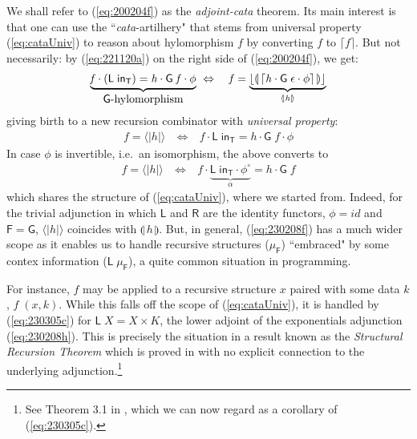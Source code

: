 \documentclass{elsarticle}
\newcommand{\Conid}[1]{\mathit{#1}}
\newcommand{\Varid}[1]{\mathit{#1}}
\def\comp{ \mathbin{\cdot} }
\def\conv#1{#1^\circ}
\def\fun#1{\mathsf{#1}}
\def\wider#1{~ #1 ~}
\def\muF{\mu_{\fun F}}
\def\muF{\mu_{\fun F}}
\def\equiv{\Leftrightarrow}
\def\quanta#1{\mathopen{\langle\!|}#1\mathclose{|\!\rangle}}
\begin{document}
We shall refer to (\ref{eq:200204f}) as the \emph{adjoint-cata} theorem.
Its main interest is that one can use the ``\emph{cata}-artilhery" that stems
from universal property (\ref{eq:cataUniv}) to reason about hylomorphism \ensuremath{\Varid{f}}
by converting \ensuremath{\Varid{f}} to \ensuremath{\lceil \Varid{f}\rceil}. But not necessarily: by (\ref{eq:221120a})
on the right side of (\ref{eq:200204f}), we get:
\begin{eqnarray}
	\underbrace{\ensuremath{\Varid{f} \comp (\fun L \;\mathsf{in}_{\fun T})\mathrel{=}\Varid{h} \comp \fun G \;\Varid{f} \comp \phi }}_{\mbox{\ensuremath{\fun G }-hylomorphism}}
&
	\wider\equiv
&
	\ensuremath{\Varid{f}\mathrel{=}\underbrace{\lfloor \llparenthesis\,\lceil \Varid{h} \comp \fun G \;\epsilon  \comp \phi \rceil\,\rrparenthesis\rfloor}_{\quanta{\Varid{h}}}}
	\label{eq:230305c}
\end{eqnarray}
giving birth to a new recursion combinator with \emph{universal property}:
\begin{eqnarray*}
	\ensuremath{\Varid{f}\mathrel{=}\quanta{\Varid{h}}}
&
	\wider\equiv
&
	\ensuremath{\Varid{f} \comp \fun L \;\mathsf{in}_{\fun T}\mathrel{=}\Varid{h} \comp \fun G \;\Varid{f} \comp \phi }
\end{eqnarray*}
In case \ensuremath{\phi } is invertible, i.e.\ an isomorphism, the above converts to
\begin{eqnarray}
	\ensuremath{\Varid{f}\mathrel{=}\quanta{\Varid{h}}}
&
	\wider\equiv
&
	\ensuremath{\Varid{f} \comp \underbrace{\fun L \;\mathsf{in}_{\fun T} \comp \conv{\phi }}_{\alpha }\mathrel{=}\Varid{h} \comp \fun G \;\Varid{f}}
	\label{eq:230208f} 
\end{eqnarray}
which shares the structure of (\ref{eq:cataUniv}), where we started from.
Indeed, for the trivial adjunction in which \ensuremath{\fun L } and \ensuremath{\fun R } are the identity
functors, \ensuremath{\phi \mathrel{=}{id}} and \ensuremath{\fun F \mathrel{=}\fun G }, \ensuremath{\quanta{\Varid{h}}} coincides with \ensuremath{\llparenthesis\,\Varid{h}\,\rrparenthesis}.
But, in general, (\ref{eq:230208f}) has a much wider scope as it enables us
to handle recursive structures (\ensuremath{\muF }) ``embraced" by some contex information
(\ensuremath{\fun L \;\muF }), a quite common situation in programming. 

For instance, \ensuremath{\Varid{f}} may be applied to a recursive structure \ensuremath{\Varid{x}} paired with some 
data \ensuremath{\Varid{k}}, \ensuremath{\Varid{f}\;(\Varid{x},\Varid{k})}. While this falls off the scope of (\ref{eq:cataUniv}), it is
handled by (\ref{eq:230305c}) for \ensuremath{\fun L \;\Conid{X}\mathrel{=}\Conid{X} \times \Conid{K}}, the lower adjoint
of the exponentials adjunction (\ref{eq:230208h}). This is precisely the situation
in a result known as the \emph{Structural Recursion Theorem} which is proved
in \cite{BM97} with no explicit connection to the underlying adjunction.\footnote{
See Theorem 3.1 in \cite{BM97}, which we can now regard as a corollary of (\ref{eq:230305c}).}
\end{document}
